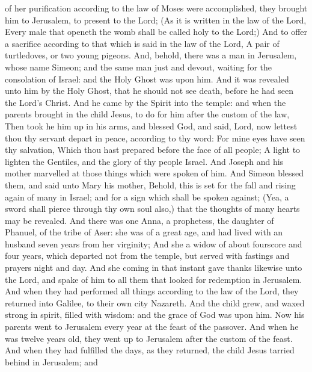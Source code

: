 {of
her
purification according
to the
law of
Moses were
accomplished, they
brought
him
to
Jerusalem, to
present
{} to the
Lord;
(As it is
written
in the
law of the
Lord,
Every
male that
openeth the
womb shall be
called
holy to the
Lord;)
And to
offer a
sacrifice according
to that which is
said
in the
law of the
Lord, A
pair of
turtledoves,
or
two
young
pigeons.
And,
behold, there
was a
man
in
Jerusalem,
whose
name
{}
Simeon;
and the
same
man
{}
just
and
devout,
waiting for the
consolation of
Israel:
and
the
Holy
Ghost
was
upon
him.
And it
was
revealed unto
him
by
the
Holy
Ghost, that he
should
not
see
death,
before he had
seen
the
Lord’s
Christ.
And he
came
by the
Spirit
into the
temple:
and
when the
parents brought
in the
child
Jesus, to
do
for
him
after the
custom of the
law,
Then
took
he
him
up
in
his
arms,
and
blessed
God,
and
said,
Lord,
now lettest
thou
thy
servant
depart
in
peace, according
to
thy
word:
For
mine
eyes have
seen
thy
salvation,
Which thou hast
prepared
before the
face of
all
people;
A
light
to
lighten the
Gentiles,
and the
glory
of
thy
people
Israel.
And
Joseph
and
his
mother
marvelled
at those things which were
spoken
of
him.
And
Simeon
blessed
them,
and
said
unto
Mary
his
mother,
Behold,
this
{} is
set
for the
fall
and rising
again of
many
in
Israel;
and
for a
sign which shall be spoken
against;
(Yea, a
sword shall pierce
through
thy
own
soul
also,)
that the
thoughts
of
many
hearts may be
revealed.
And there
was one
Anna, a
prophetess, the
daughter of
Phanuel,
of the
tribe of
Aser:
she was
of a
great
age, and had
lived
with an
husband
seven
years
from
her
virginity;
And
she
{} a
widow of
about fourscore and
four
years,
which
departed
not
from the
temple, but
served
{} with
fastings
and
prayers
night
and
day.
And
she coming
in
that
instant gave thanks
likewise unto the
Lord,
and
spake
of
him to
all them that
looked for
redemption
in
Jerusalem.
And
when they had
performed all
things according
to the
law of the
Lord, they
returned
into
Galilee,
to their
own
city
Nazareth.
And the
child
grew,
and waxed
strong in
spirit,
filled with
wisdom:
and the
grace of
God
was
upon
him.
Now
his
parents
went
to
Jerusalem
every
year at the
feast of the
passover.
And
when he
was
twelve years
old,
they went
up
to
Jerusalem
after the
custom of the
feast.
And when they had
fulfilled the
days,
as
they
returned, the
child
Jesus tarried
behind
in
Jerusalem;
and
}
